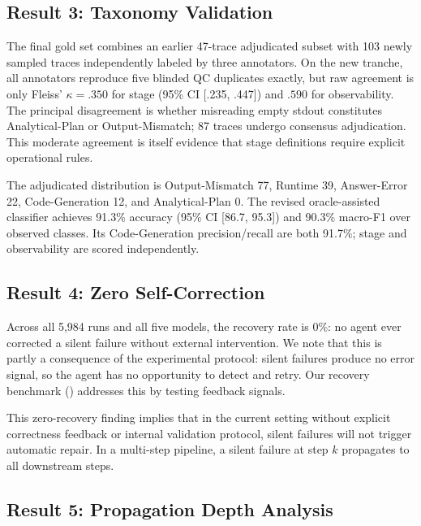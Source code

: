 \subsection{Result 3: Taxonomy Validation}
\label{sec:res-taxonomy}

The final gold set combines an earlier 47-trace adjudicated subset with 103 newly sampled traces independently labeled by three annotators. On the new tranche, all annotators reproduce five blinded QC duplicates exactly, but raw agreement is only Fleiss' $\kappa=.350$ for stage (95\% CI [.235, .447]) and $.590$ for observability. The principal disagreement is whether misreading empty stdout constitutes Analytical-Plan or Output-Mismatch; 87 traces undergo consensus adjudication. This moderate agreement is itself evidence that stage definitions require explicit operational rules.

The adjudicated distribution is Output-Mismatch 77, Runtime 39, Answer-Error 22, Code-Generation 12, and Analytical-Plan 0. The revised oracle-assisted classifier achieves 91.3\% accuracy (95\% CI [86.7, 95.3]) and 90.3\% macro-F1 over observed classes. Its Code-Generation precision/recall are both 91.7\%; stage and observability are scored independently.

\subsection{Result 4: Zero Self-Correction}
\label{sec:res-recovery}

Across all 5{,}984 runs and all five models, the recovery rate is 0\%: no agent ever corrected a silent failure without external intervention. We note that this is partly a consequence of the experimental protocol: silent failures produce no error signal, so the agent has no opportunity to detect and retry. Our recovery benchmark () addresses this by testing feedback signals.

This zero-recovery finding implies that in the current setting without explicit correctness feedback or internal validation protocol, silent failures will not trigger automatic repair. In a multi-step pipeline, a silent failure at step $k$ propagates to all downstream steps.

\subsection{Result 5: Propagation Depth Analysis}
\label{sec:res-propagation}

